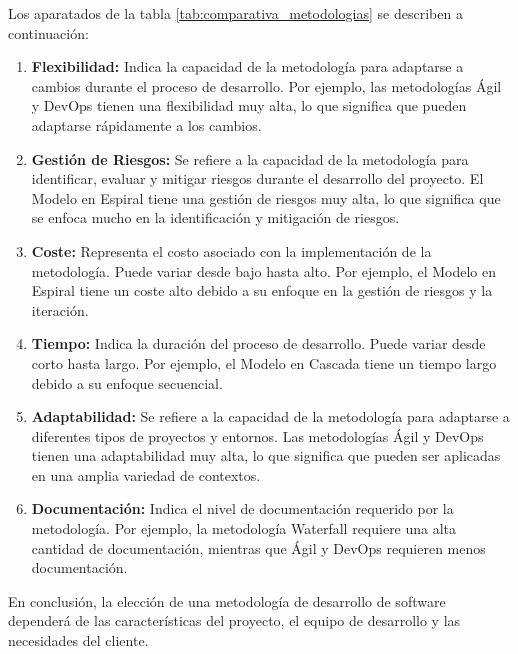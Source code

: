 Los aparatados de la tabla \ref{tab:comparativa_metodologias} se describen a continuación:

\begin{enumerate}
    \item \textbf{Flexibilidad:} Indica la capacidad de la metodología para adaptarse a cambios durante el proceso de desarrollo. Por ejemplo, las metodologías Ágil y DevOps tienen una flexibilidad muy alta, lo que significa que pueden adaptarse rápidamente a los cambios.
    \item \textbf{Gestión de Riesgos:} Se refiere a la capacidad de la metodología para identificar, evaluar y mitigar riesgos durante el desarrollo del proyecto. El Modelo en Espiral tiene una gestión de riesgos muy alta, lo que significa que se enfoca mucho en la identificación y mitigación de riesgos.
    \item \textbf{Coste:} Representa el costo asociado con la implementación de la metodología. Puede variar desde bajo hasta alto. Por ejemplo, el Modelo en Espiral tiene un coste alto debido a su enfoque en la gestión de riesgos y la iteración.
    \item \textbf{Tiempo:} Indica la duración del proceso de desarrollo. Puede variar desde corto hasta largo. Por ejemplo, el Modelo en Cascada tiene un tiempo largo debido a su enfoque secuencial.
    \item \textbf{Adaptabilidad:} Se refiere a la capacidad de la metodología para adaptarse a diferentes tipos de proyectos y entornos. Las metodologías Ágil y DevOps tienen una adaptabilidad muy alta, lo que significa que pueden ser aplicadas en una amplia variedad de contextos.
    \item \textbf{Documentación:} Indica el nivel de documentación requerido por la metodología. Por ejemplo, la metodología Waterfall requiere una alta cantidad de documentación, mientras que Ágil y DevOps requieren menos documentación.
\end{enumerate}

En conclusión, la elección de una metodología de desarrollo de software dependerá de las características del proyecto, el equipo de desarrollo y las necesidades del cliente.

